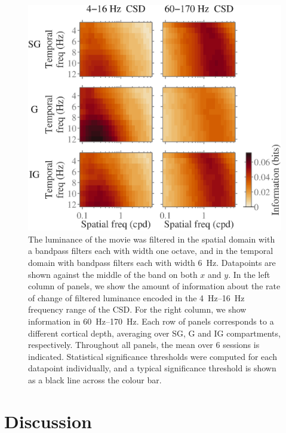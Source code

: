 \begin{figure}[htbp]
\centering
\includegraphics[scale=.5]{figs/tmf/tmf-v-spares-sggig-avg-spatmf2-2Band.eps}
%
\caption{
The luminance of the movie was filtered in the spatial domain with a bandpass filters each with width one octave, and in the temporal domain with bandpass filters each with width \SI{6}{Hz}.
Datapoints are shown against the middle of the band on both $x$ and $y$.
In the left column of panels, we show the amount of information about the rate of change of filtered luminance encoded in the \SIrange{4}{16}{Hz} frequency range of the \ac{CSD}.
For the right column, we show information in \SIrange{60}{170}{Hz}.
Each row of panels corresponds to a different cortical depth, averaging over \ac{SG}, \ac{G} and \ac{IG} compartments, respectively.
Throughout all panels, the mean over \num{6} sessions is indicated.
Statistical significance thresholds were computed for each datapoint individually, and a typical significance threshold is shown as a black line across the colour bar.
}%
\label{fig:lam_spatmf}
%
\end{figure}


\section{Discussion}

